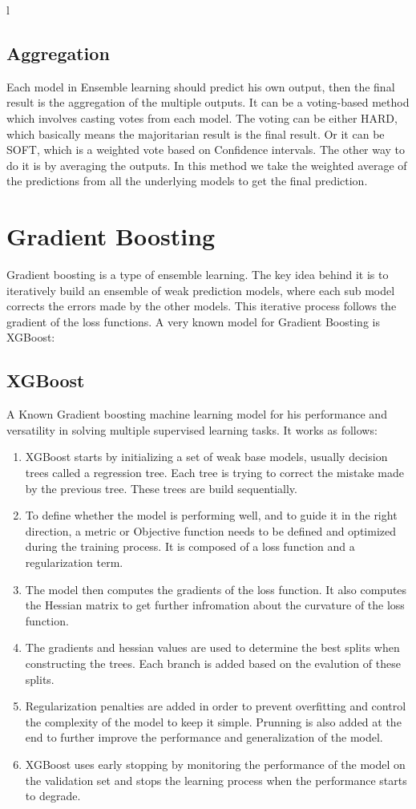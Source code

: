 l\documentclass[a4paper,12pt,twoside]{report}
\begin{document}
\subsection{Aggregation}
Each model in Ensemble learning should predict his own output, then the final result is the aggregation of the multiple outputs. It can be a voting-based method which involves casting votes from each model. The voting can be either HARD, which basically means the majoritarian result is the final result. Or it can be SOFT, which is a weighted vote based on Confidence intervals.
The other way to do it is by averaging the outputs. In this method we take the weighted average of the predictions from all the underlying models to get the final prediction.
\section{Gradient Boosting}
Gradient boosting is a type of ensemble learning. The key idea behind it is to iteratively build an ensemble of weak prediction models, where each sub model corrects the errors made by the other models. This iterative process follows the gradient of the loss functions.
A very known model for Gradient Boosting is XGBoost:
\subsection{XGBoost}
A Known Gradient boosting machine learning model for his performance and versatility in solving multiple supervised learning tasks. It works as follows:
\begin{enumerate}	
\item XGBoost starts by initializing a set of weak base models, usually decision trees called a regression tree. Each tree is trying to correct the mistake made by the previous tree. These trees are build sequentially.
\item To define whether the model is performing well, and to guide it in the right direction, a metric or Objective function needs to be defined and optimized during the training process. It is composed of a loss function and a regularization term.
\item The model then computes the gradients of the loss function. It also computes the Hessian matrix to get further infromation about the curvature of the loss function.
\item The gradients and hessian values are used to determine the best splits when constructing the trees. Each branch is added based on the evalution of these splits.
\item Regularization penalties are added in order to prevent overfitting and control the complexity of the model to keep it simple. Prunning is also added at the end to further improve the performance and generalization of the model.
\item XGBoost uses early stopping by monitoring the performance of the model on the validation set and stops the learning process when the performance starts to degrade.
\end{enumerate}
\end{document}
